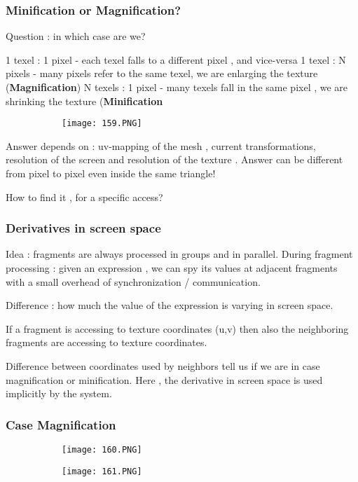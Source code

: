 \documentclass{article}
\begin{document}
\subsubsection{Minification or Magnification?}

Question : in which case are we?

1 texel : 1 pixel - each texel falls to a different pixel , and vice-versa
1 texel : N pixels - many pixels refer to the same texel, we are enlarging the texture (\textbf{Magnification})
N texels : 1 pixel - many texels fall in the same pixel , we are shrinking the texture (\textbf{Minification}

\begin{figure}[ht!]
  \centering
  \begin{subfigure}[b]{0.4\linewidth}
    \texttt{[image: 159.PNG]}
  \end{subfigure}
\end{figure}

Answer depends on : uv-mapping of the mesh , current transformations, resolution of the screen and resolution of the texture . Answer can be different from pixel to pixel even inside the same triangle!

How to find it , for a specific access?

\subsubsection{Derivatives in screen space}

Idea : fragments are always processed in groups and in parallel.
During fragment processing : given an expression , we can spy its values at adjacent fragments with a small overhead of synchronization / communication.

Difference : how much the value of the expression is varying in screen space.

If a fragment is accessing to texture coordinates (u,v) then also the neighboring fragments are accessing to texture coordinates.

Difference between coordinates used by neighbors tell us if we are in case magnification or minification. Here , the derivative in screen space is used implicitly by the system.


\subsubsection{Case Magnification}

\begin{figure}[ht!]
  \centering
  \begin{subfigure}[b]{0.5\linewidth}
    \texttt{[image: 160.PNG]}
  \end{subfigure}
  \begin{subfigure}[b]{0.49\textwidth}
         \centering
         \texttt{[image: 161.PNG]}
     \end{subfigure}
\end{figure}
\end{document}
